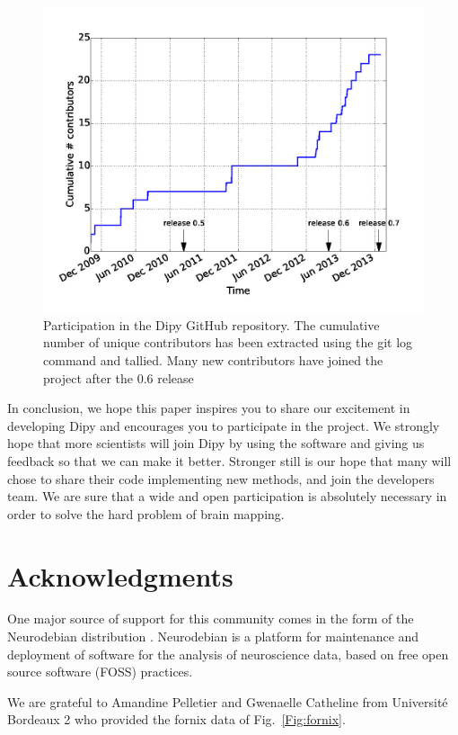 \documentclass{bioinfo}
\begin{document}
\begin{figure}
\centering{}
\includegraphics[scale=0.37]{Figures/fig-gh2.jpg}
\caption{Participation in the Dipy GitHub repository. The cumulative number of
  unique contributors has been extracted using the git log command and tallied. Many
  new contributors have joined the project after the 0.6 release \label{Fig:gh_stats}}
\end{figure}

In conclusion, we hope this paper inspires you to share our excitement in developing Dipy and encourages
you to participate in the project. We strongly hope that more scientists will join
Dipy by using the software and giving us feedback so that we can make it better. Stronger still
is our hope that many will chose to share their code implementing new methods, and join the developers team. We are sure that
a wide and open participation is absolutely necessary in order to solve the hard problem of brain mapping.


\section*{Acknowledgments}
One major source of support for this community comes in the form of the Neurodebian
distribution \citep{Halchenko2012}. Neurodebian is a platform for maintenance
and deployment of software for the analysis of neuroscience data, based on free
open source software (FOSS) practices.

We are grateful to Amandine Pelletier and Gwenaelle Catheline from Universit\'{e} Bordeaux 2 who provided the fornix data of Fig.~\ref{Fig:fornix}.
\end{document}
